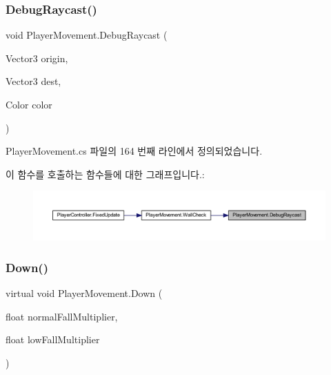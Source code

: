 \subsubsection{\texorpdfstring{DebugRaycast()}{DebugRaycast()}}
{\footnotesize\ttfamily void Player\+Movement.\+Debug\+Raycast (\begin{DoxyParamCaption}\item[{Vector3}]{origin,  }\item[{Vector3}]{dest,  }\item[{Color}]{color }\end{DoxyParamCaption})\hspace{0.3cm}{\ttfamily [private]}}



Player\+Movement.\+cs 파일의 164 번째 라인에서 정의되었습니다.


\begin{DoxyCode}{0}

\end{DoxyCode}
이 함수를 호출하는 함수들에 대한 그래프입니다.\+:\nopagebreak
\begin{figure}[H]
\begin{center}
\leavevmode
\includegraphics[width=350pt]{d0/d3d/class_player_movement_a10abf2ced0397cbfa0cc29a0296023fb_icgraph}
\end{center}
\end{figure}
\mbox{\label{class_player_movement_aa93c724e750d78276b1ef3df18ee2383}} 
\subsubsection{\texorpdfstring{Down()}{Down()}}
{\footnotesize\ttfamily virtual void Player\+Movement.\+Down (\begin{DoxyParamCaption}\item[{float}]{normal\+Fall\+Multiplier,  }\item[{float}]{low\+Fall\+Multiplier }\end{DoxyParamCaption})\hspace{0.3cm}{\ttfamily [virtual]}}



